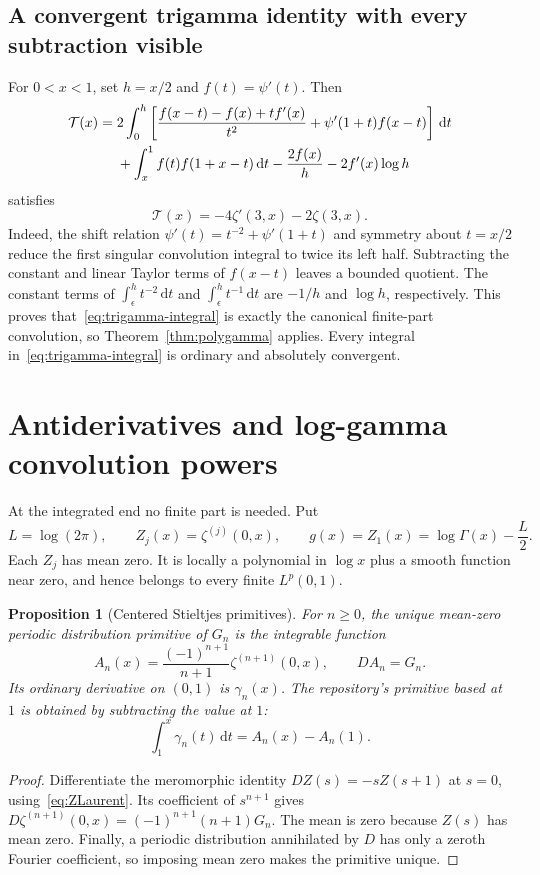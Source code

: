 \documentclass[11pt]{article}
\numberwithin{equation}{section}
\newtheorem{proposition}[theorem]{Proposition}
\theoremstyle{definition}
\theoremstyle{remark}
\newcommand{\dd}{\,\mathrm d}
\begin{document}
\subsection{A convergent trigamma identity with every subtraction visible}
For $0<x<1$, set $h=x/2$ and $f(t)=\psi'(t)$. Then
\begin{align}
 \mathcal T(x)={}&2\int_0^h\left[
       \frac{f(x-t)-f(x)+tf'(x)}{t^2}
        +\psi'(1+t)f(x-t)\right]\dd t\label{eq:trigamma-integral}\\
 &+\int_x^1f(t)f(1+x-t)\dd t
      -\frac{2f(x)}h-2f'(x)\log h\notag
\end{align}
satisfies
\begin{equation}\label{eq:trigamma-value}
 \mathcal T(x)=-4\zeta'(3,x)-2\zeta(3,x).
\end{equation}
Indeed, the shift relation $\psi'(t)=t^{-2}+\psi'(1+t)$ and symmetry
about $t=x/2$ reduce the first singular convolution integral to twice
its left half. Subtracting the constant and linear Taylor terms of
$f(x-t)$ leaves a bounded quotient. The constant terms of
$\int_\epsilon^ht^{-2}\dd t$ and
$\int_\epsilon^ht^{-1}\dd t$ are $-1/h$ and $\log h$,
respectively. This proves that~\eqref{eq:trigamma-integral} is exactly
the canonical finite-part convolution, so Theorem~\ref{thm:polygamma}
applies. Every integral in~\eqref{eq:trigamma-integral} is ordinary and
absolutely convergent.

\section{Antiderivatives and log-gamma convolution powers}
\label{sec:gamma}
At the integrated end no finite part is needed. Put
\begin{equation}\label{eq:gr}
 L=\log(2\pi),\qquad Z_j(x)=\zeta^{(j)}(0,x),\qquad
 g(x)=Z_1(x)=\log\Gamma(x)-\frac L2.
\end{equation}
Each $Z_j$ has mean zero. It is locally a polynomial in $\log x$ plus
a smooth function near zero, and hence belongs to every finite $L^p(0,1)$.

\begin{proposition}[Centered Stieltjes primitives]\label{prop:primitive}
For $n\ge0$, the unique mean-zero periodic distribution primitive of
$G_n$ is the integrable function
\begin{equation}\label{eq:primitive}
 A_n(x)=\frac{(-1)^{n+1}}{n+1}\zeta^{(n+1)}(0,x),\qquad DA_n=G_n.
\end{equation}
Its ordinary derivative on $(0,1)$ is $\gamma_n(x)$. The repository's
primitive based at $1$ is obtained by subtracting the value at $1$:
\[
 \int_1^x\gamma_n(t)\dd t=A_n(x)-A_n(1).
\]
\end{proposition}
\begin{proof}
Differentiate the meromorphic identity $DZ(s)=-sZ(s+1)$ at $s=0$,
using~\eqref{eq:ZLaurent}. Its coefficient of $s^{n+1}$ gives
$D\zeta^{(n+1)}(0,x)=(-1)^{n+1}(n+1)G_n$. The mean is zero because
$Z(s)$ has mean zero. Finally, a periodic distribution annihilated by
$D$ has only a zeroth Fourier coefficient, so imposing mean zero makes
the primitive unique.
\end{proof}
\end{document}
